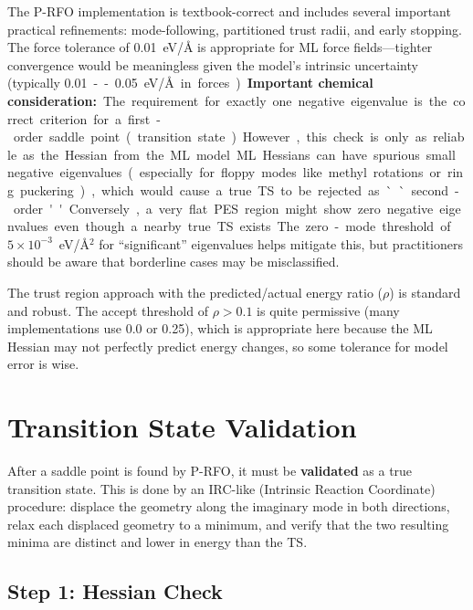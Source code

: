 \documentclass[11pt,a4paper]{article}
\begin{document}
\begin{evaluation}
The P-RFO implementation is textbook-correct and includes several important practical refinements: mode-following, partitioned trust radii, and early stopping. The force tolerance of \SI{0.01}{eV/\angstrom} is appropriate for ML force fields---tighter convergence would be meaningless given the model's intrinsic uncertainty (typically \SI{0.01}--\SI{0.05}{eV/\angstrom} in forces).

\textbf{Important chemical consideration:} The requirement for exactly one negative eigenvalue is the correct criterion for a first-order saddle point (transition state). However, this check is only as reliable as the Hessian from the ML model. ML Hessians can have spurious small negative eigenvalues (especially for floppy modes like methyl rotations or ring puckering), which would cause a true TS to be rejected as ``second-order.'' Conversely, a very flat PES region might show zero negative eigenvalues even though a nearby true TS exists. The zero-mode threshold of $5 \times 10^{-3}$~eV/\AA$^2$ for ``significant'' eigenvalues helps mitigate this, but practitioners should be aware that borderline cases may be misclassified.

The trust region approach with the predicted/actual energy ratio ($\rho$) is standard and robust. The accept threshold of $\rho > 0.1$ is quite permissive (many implementations use 0.0 or 0.25), which is appropriate here because the ML Hessian may not perfectly predict energy changes, so some tolerance for model error is wise.
\end{evaluation}


\section{Transition State Validation}
\label{sec:ts-validation}

After a saddle point is found by P-RFO, it must be \textbf{validated} as a true transition state. This is done by an IRC-like (Intrinsic Reaction Coordinate) procedure: displace the geometry along the imaginary mode in both directions, relax each displaced geometry to a minimum, and verify that the two resulting minima are distinct and lower in energy than the TS.

\subsection{Step 1: Hessian Check}
\end{document}

